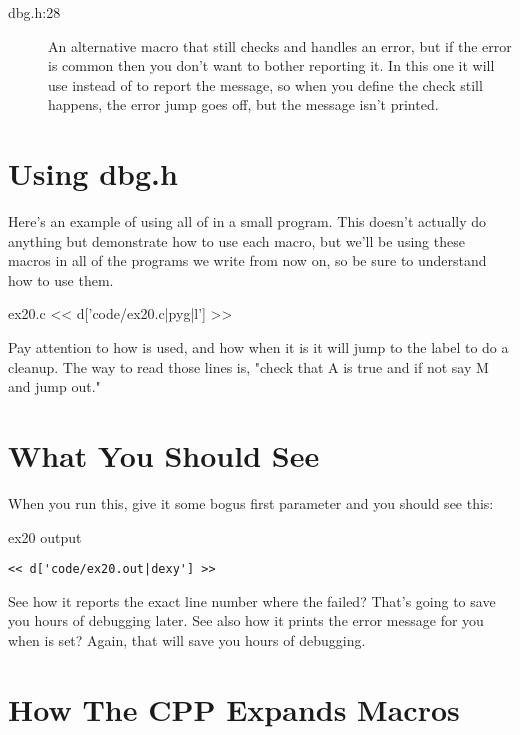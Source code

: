 \begin{description}
\item[dbg.h:28] An alternative macro  that still checks and
    handles an error, but if the error is common then you don't want to bother
    reporting it.  In this one it will use  instead of 
    to report the message, so when you define  the check still
    happens, the error jump goes off, but the message isn't printed.
\end{description}

\section{Using dbg.h}

Here's an example of using all of  in a small program.
This doesn't actually do anything but demonstrate how to use each
macro, but we'll be using these macros in all of the programs we
write from now on, so be sure to understand how to use them.

\begin{code}{ex20.c}
<< d['code/ex20.c|pyg|l'] >>
\end{code}

Pay attention to how  is used, and how when it is
 it will jump to the  label to do a cleanup.
The way to read those lines is, "check that A is true and if not say M
and jump out."

\section{What You Should See}

When you run this, give it some bogus first parameter and you should see
this:

\begin{code}{ex20 output}
\begin{lstlisting}
<< d['code/ex20.out|dexy'] >>
\end{lstlisting}
\end{code}

See how it reports the exact line number where the  failed?
That's going to save you hours of debugging later.  See also how it 
prints the error message for you when  is set? Again,
that will save you hours of debugging.

\section{How The CPP Expands Macros}

